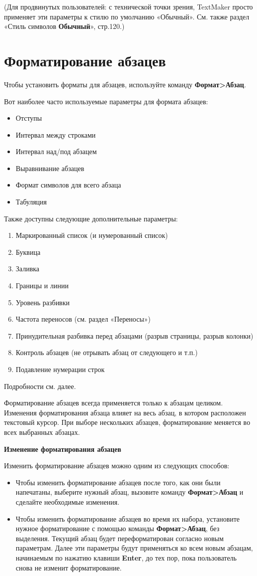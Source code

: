 \documentclass[a4paper,10pt]{article}
\begin{document}
(Для продвинутых пользователей: с технической точки зрения, TextMaker просто применяет эти параметры к стилю по умолчанию  «Обычный». См. также раздел «Стиль символов \textbf{Обычный}», стр.120.)

\section{Форматирование абзацев}
Чтобы установить форматы для абзацев, используйте команду \textbf{Формат>Абзац}.

Вот наиболее часто используемые параметры для формата абзацев:
\begin{itemize}
 \item Отступы
 \item Интервал между строками
 \item Интервал над/под абзацем
 \item Выравнивание абзацев
 \item Формат символов для всего абзаца
 \item Табуляция
\end{itemize}

Также доступны следующие дополнительные параметры:
\begin{enumerate}
 \item Маркированный список (и нумерованный список)
 \item Буквица
 \item Заливка
 \item Границы и линии
 \item Уровень разбивки
 \item Частота переносов (см. раздел «Переносы»)
 \item Принудительная разбивка перед абзацами (разрыв страницы, разрыв колонки)
 \item Контроль абзацев (не отрывать абзац от следующего и т.п.)
 \item Подавление нумерации строк
\end{enumerate}

Подробности см. далее.

Форматирование абзацев всегда применяется только к абзацам целиком. Изменения форматирования абзаца влияет на весь абзац, в котором расположен текстовый курсор. При выборе нескольких абзацев, форматирование меняется во всех выбранных абзацах.

\textbf{Изменение форматирования абзацев}

Изменить форматирование абзацев можно одним из следующих способов:
\begin{itemize}
 \item Чтобы изменить форматирование абзацев после того, как они были напечатаны, выберите нужный абзац, вызовите команду \textbf{Формат>Абзац} и сделайте необходимые изменения.
 \item Чтобы изменить форматирование абзацев во время их набора, установите нужное форматирование с помощью команды \textbf{Формат>Абзац}, без выделения. Текущий абзац будет переформатирован согласно новым параметрам. Далее эти параметры будут применяться ко всем новым абзацам, начинаемым по нажатию клавиши \textbf{Enter}, до тех пор, пока пользователь снова не изменит форматирование.
\end{itemize}
\end{document}

